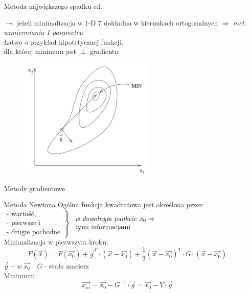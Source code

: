   \begin{frame}{Metoda największego spadku cd.}

    \begin{block}{}
      $\rightarrow$ jeżeli minimalizacja w 1-D 7 dokładna w kierunkach ortogonalnych
      $\Rightarrow$ \emph{met. uzmienniania 1 parametru}
      \smallskip
      \\Łatwo o przykład hipotetycznej funkcji,
      \\ dla której  minimum jest $\perp$ gradientu
  	\end{block}
    \begin{figure}
		\centering
		\includegraphics[height=0.5\textheight ,width=0.6\textwidth]{img/17/high_fall_met_2}
	\end{figure}

  \end{frame}

  \begin{frame}{Metody gradientowe}

    \begin{block}{Metoda Newtona}
      Ogólna funkcja kwadratowa jest określona przez:
      \\$\left.
        \begin{array}{l}
          \text{- wartość,} \\
          \text{- pierwsze i} \\
          \text{- drugie pochodne}
	    \end{array}
	  \right\}$
	  $\begin{array}{l} \text{\emph{w dowolnym punkcie }} x_0 \Rightarrow \\ \text{tymi informacjami} \end{array}$
	  \smallskip
	  \\Minimalizacja w pierwszym kroku.
	  \begin{displaymath}
	  		F(\vec{x}) = F(\vec{x_0}) + \vec{g}^T \cdot (\vec{x} - \vec{x_0}) +
	  		\frac{1}{2} (\vec{x} - \vec{x_0})^T \cdot G \cdot (\vec{x} - \vec{x_0})
	  \end{displaymath}
	  $\vec{g} - w \ \vec{x_0} \quad G$ -  stała macierz
	  \smallskip
	  \\Minimum:
	  \begin{displaymath}
	  		\vec{x_m} = \vec{x_0} - G^{-1} \cdot \vec{g} =  \vec{x_0} - V \cdot \vec{g}
	  \end{displaymath}
	\end{block}

  \end{frame}

